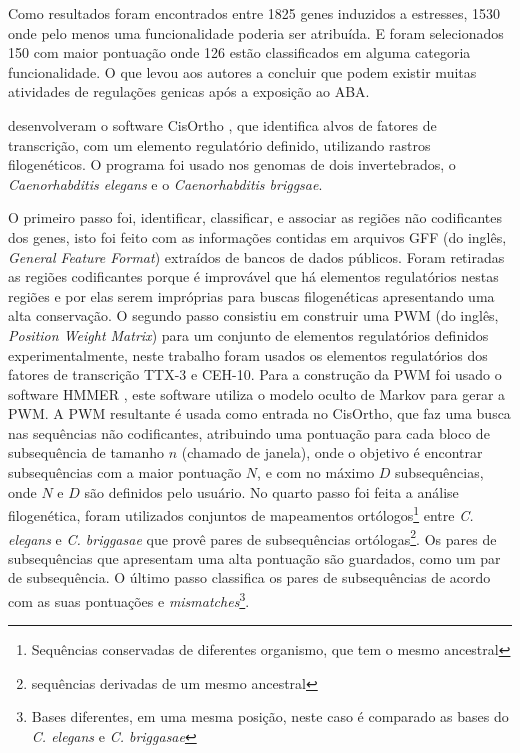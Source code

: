 Como resultados foram encontrados entre 1825 genes induzidos a estresses, 1530 onde pelo menos uma funcionalidade poderia ser atribuída. E foram selecionados 150 com maior pontuação onde 126 estão classificados em alguma categoria funcionalidade. O que levou aos autores a concluir que podem existir muitas atividades de regulações genicas após a exposição ao ABA.



\cite{Bigelow2004CisOrtho} desenvolveram o software CisOrtho , que identifica alvos de fatores de transcrição, com um elemento regulatório definido, utilizando rastros filogenéticos. O programa foi usado nos genomas de dois invertebrados, o \textit{Caenorhabditis elegans} e o \textit{Caenorhabditis briggsae}.

O primeiro passo foi, identificar, classificar, e associar as regiões não codificantes dos genes, isto foi feito com as informações contidas em arquivos GFF (do inglês, \textit{General Feature Format}) extraídos de bancos de dados públicos. Foram retiradas as regiões codificantes porque é improvável que há elementos regulatórios nestas regiões e por elas serem impróprias para buscas filogenéticas apresentando uma alta conservação. O segundo passo consistiu em construir uma PWM (do inglês, \textit{Position Weight Matrix}) para um conjunto de elementos regulatórios definidos experimentalmente, neste trabalho foram usados os elementos regulatórios dos fatores de transcrição TTX-3 e CEH-10. Para a construção da PWM foi usado o software HMMER \cite{Eddy1998}, este software utiliza o modelo oculto de Markov para gerar a PWM. A PWM resultante é usada como entrada no CisOrtho, que faz uma busca nas sequências não codificantes, atribuindo uma pontuação para cada bloco de subsequência de tamanho $n$ (chamado de janela), onde o objetivo é encontrar subsequências com a maior pontuação $N$, e com no máximo $D$ subsequências, onde $N$ e $D$ são definidos pelo usuário. No quarto passo foi feita a análise filogenética, foram utilizados conjuntos de mapeamentos ortólogos\footnote{Sequências conservadas de diferentes organismo, que tem o mesmo ancestral} entre \textit{C. elegans} e \textit{C. briggasae} que provê pares de subsequências ortólogas\footnote{sequências derivadas de um mesmo ancestral}. Os pares de subsequências que apresentam uma alta pontuação são guardados, como um par de subsequência. O último passo classifica os pares de subsequências  de acordo com as suas pontuações e \textit{mismatches}\footnote{Bases diferentes, em uma mesma posição, neste caso é comparado as bases do \textit{C. elegans} e \textit{C. briggasae}}.

